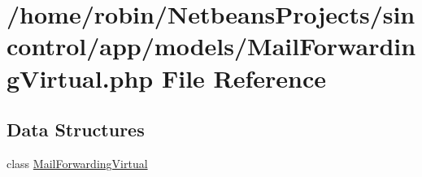 \hypertarget{_mail_forwarding_virtual_8php}{}\section{/home/robin/\+Netbeans\+Projects/sincontrol/app/models/\+Mail\+Forwarding\+Virtual.php File Reference}
\label{_mail_forwarding_virtual_8php}
\subsection*{Data Structures}
\begin{DoxyCompactItemize}
\item 
class \hyperlink{class_mail_forwarding_virtual}{Mail\+Forwarding\+Virtual}
\end{DoxyCompactItemize}
